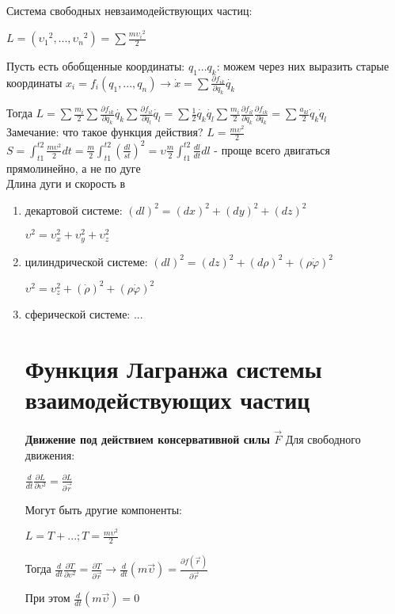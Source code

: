 \documentclass[a4paper,12pt]{report}
\begin{document}
Система свободных невзаимодействующих частиц:

$L=({\upsilon_1}^2, ..., {\upsilon_n}^2)=\sum\frac{m{\upsilon_i}^2}{2}$

Пусть есть обобщенные координаты: $q_1...q_k$: можем через них выразить старые координаты $x_i=f_i(q_1, ...,  q_n) \to \dot{x}=\sum\frac{\partial f_{ik}}{\partial q_k}\dot{q_k}$

Тогда $L=\sum\frac{m_i}{2} \sum\frac{\partial f_{ik}}{\partial q_k}\dot{q_k} \sum\frac{\partial f_{il}}{\partial q_l}\dot{q_l}=\sum\frac{1}{2}\dot{q_k}\dot{q_l}\sum \frac{m_i}{2} \frac{\partial f_{il}}{\partial q_k}\frac{\partial f_{ik}}{\partial q_k}=\sum\frac{a_{kl}}{2}\dot{q}_k\dot{q}_l$\\

Замечание: что такое функция действия? $L=\frac{m\upsilon^2}{2}$\\

$S=\int^{t2}_{t1} \frac{m\upsilon^2}{2}dt=\frac{m}{2}\int^{t2}_{t1}\left( \frac{dl}{st}\right)^2=\upsilon\frac{m}{2}\int^{t2}_{t1}\frac{dl}{dt}dl$ - проще всего двигаться прямолинейно, а не по дуге\\

Длина дуги и скорость в \begin{enumerate}
  \item декартовой системе: $(dl)^2=(dx)^2+(dy)^2+(dz)^2$
  
  $\upsilon^2=\upsilon_x^2+\upsilon_y^2+\upsilon_z^2$
  
  \item цилиндрической системе:  $(dl)^2=(dz)^2+(d\rho)^2+(\rho\dot{\varphi})^2$
  
  $\upsilon^2=\upsilon_z^2+(\dot{\rho})^2+(\rho\dot{\varphi})^2$
  
  \item сферической системе: ...
  
  \section{Функция Лагранжа системы взаимодействующих частиц}
  \textbf{Движение под действием консервативной силы $\vec{F}$}
Для свободного движения:

  $\frac{d}{dt}\frac{\partial{L}}{\partial{\upsilon^2}}=\frac{\partial{L}}{\partial{\vec{r}}}$

  Могут быть другие компоненты:
  
  $L=T+...; T=\frac{m\upsilon^2}{2}$  
  
Тогда     $\frac{d}{dt}\frac{\partial{T}}{\partial{\upsilon^2}}=\frac{\partial{T}}{\partial{\vec{r}}} \to \frac{d}{dt}(m\vec{\upsilon})=\frac{\partial{f(\vec{r})}}{\partial{\vec{r}}}$

При этом $\frac{d}{dt}(m\vec{\upsilon})=0$   
\end{enumerate}
\end{document}
